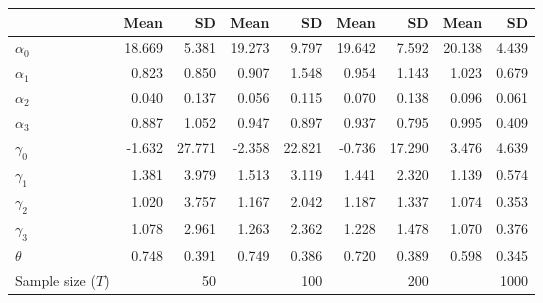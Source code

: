 
\begin{tabular}[t]{lrrrrrrrr}
\toprule
  & Mean & SD & Mean  & SD  & Mean   & SD   & Mean    & SD   \\
\midrule
$\alpha_{0}$ & 18.669 & 5.381 & 19.273 & 9.797 & 19.642 & 7.592 & 20.138 & 4.439\\
$\alpha_{1}$ & 0.823 & 0.850 & 0.907 & 1.548 & 0.954 & 1.143 & 1.023 & 0.679\\
$\alpha_{2}$ & 0.040 & 0.137 & 0.056 & 0.115 & 0.070 & 0.138 & 0.096 & 0.061\\
$\alpha_{3}$ & 0.887 & 1.052 & 0.947 & 0.897 & 0.937 & 0.795 & 0.995 & 0.409\\
$\gamma_{0}$ & -1.632 & 27.771 & -2.358 & 22.821 & -0.736 & 17.290 & 3.476 & 4.639\\
$\gamma_{1}$ & 1.381 & 3.979 & 1.513 & 3.119 & 1.441 & 2.320 & 1.139 & 0.574\\
$\gamma_{2}$ & 1.020 & 3.757 & 1.167 & 2.042 & 1.187 & 1.337 & 1.074 & 0.353\\
$\gamma_{3}$ & 1.078 & 2.961 & 1.263 & 2.362 & 1.228 & 1.478 & 1.070 & 0.376\\
$\theta$ & 0.748 & 0.391 & 0.749 & 0.386 & 0.720 & 0.389 & 0.598 & 0.345\\
Sample size ($T$) &  & 50 &  & 100 &  & 200 &  & 1000\\
\bottomrule
\end{tabular}

